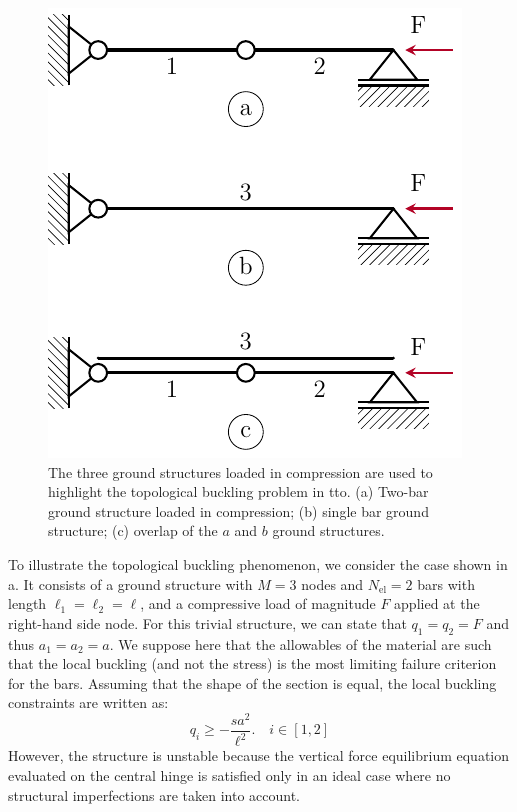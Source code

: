 \begin{figure}
    \centering
    \includegraphics{figures/04_TTO_improvements/01_3_bars_chain/3_bars_chain.pdf}
    \caption{The three ground structures loaded in compression are used to highlight the topological buckling problem in \gls{tto}. (a) Two-bar ground structure loaded in compression; (b) single bar ground structure; (c) overlap of the $a$ and $b$ ground structures.}
    \label{fig:04_chain_buck}
\end{figure}

To illustrate the topological buckling phenomenon, we consider the case shown in a. It consists of a ground structure with $M=3$ nodes and $N_{\text{el}}=2$ bars with length $\ell_1=\ell_2=\ell$, and a compressive load of magnitude $F$ applied at the right-hand side node. For this trivial structure, we can state that $q_1=q_2=F$ and thus $a_1=a_2=a$. We suppose here that the allowables of the material are such that the local buckling (and not the stress) is the most limiting failure criterion for the bars. Assuming that the shape of the section is equal, the local buckling constraints are written as:
\begin{equation}
    q_i\geq -\frac{s a^2}{\ell^2}. \quad i\in[1,2]
    \label{eq:04_chain_1}
\end{equation}
However, the structure is unstable because the vertical force equilibrium equation evaluated on the central hinge is satisfied only in an ideal case where no structural imperfections are taken into account.

